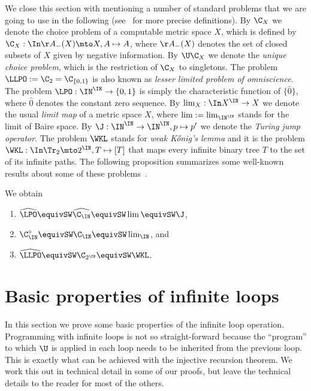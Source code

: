 \noindent
We close this section with mentioning a number of standard problems that we are going to use in the
following (see~\cite{BGP21} for more precise definitions). 
By $\C_X$ we denote the choice problem of a computable metric space $X$, which is defined
by $\C_X:\In\AA_-(X)\mto X,A\mapsto A$, where $\AA_-(X)$ denotes the set of closed subsets of $X$
given by negative information. 
By $\U\C_X$ we denote the {\em unique choice problem}, which is the restriction of $\C_X$ to singletons.
The problem $\LLPO:=\C_2=\C_{\{0,1\}}$ is also known as
{\em lesser limited problem of omniscience}. The problem $\LPO:\IN^\IN\to\{0,1\}$ is simply
the characteristic function of $\{\widehat{0}\}$, where $\widehat{0}$ denotes the constant zero sequence.
By $\lim_X:\In X^\IN\to X$ we denote the usual {\em limit map} of a metric space $X$, where $\lim:=\lim_{\IN^\IN}$
stands for the limit of Baire space. 
By $\J:\IN^\IN\to\IN^\IN,p\mapsto p'$ we denote the {\em Turing jump operator}.
The problem $\WKL$ stands for {\em weak K\H{o}nig's lemma} and it
is the problem $\WKL:\In\Tr_2\mto 2^\IN, T\mapsto [T]$ that maps every infinite binary tree $T$ to the set
of its infinite paths. The following proposition summarizes some well-known results about some of these problems~\cite{BG11,BBP12,BGP21}.

\begin{prop}
\label{prop:classical-problems}
We obtain 
\begin{enumerate}
\item $\widehat{\LPO}\equivSW\widehat{\C_\IN}\equivSW\lim\equivSW\J$, 
\item $\C_\IN^\diamond\equivSW\C_\IN\equivSW\lim_\IN$, and  
\item $\widehat{\LLPO}\equivSW\C_{2^\IN}\equivSW\WKL$.
\end{enumerate}
\end{prop}


\section{Basic properties of infinite loops}
\label{sec:basic}

In this section we prove some basic properties  of the infinite loop operation.
Programming with infinite loops is not so straight-forward because the ``program'' to which $\U$
is applied in each loop needs to be inherited from the previous loop.
This is exactly what can be achieved with the injective recursion theorem.
We work this out in technical detail in some of our proofs, but leave the technical details
to the reader for most of the others.

